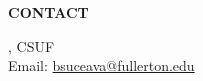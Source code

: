 \documentclass[a4paper]{article}
\begin{document}
\begin{minipage}{0.95\textwidth}
\begin{minipage}[b]{0.47\textwidth}
\medskip

\textbf{\color{csecondary}\large CONTACT }\par

, CSUF\\
Email: \href{mailto:bsuceava@fullerton.edu}{bsuceava@fullerton.edu}

\rule{0pt}{78pt}
\end{minipage}
\vspace*{-70pt}

\end{minipage}
\end{document}
